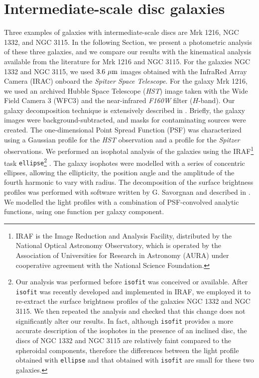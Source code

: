 \documentclass[useAMS,usenatbib,article]{mnras}
\begin{document}
\section{Intermediate-scale disc galaxies}
\label{sec:gal}
Three examples of galaxies with intermediate-scale discs are Mrk 1216, NGC 1332, and NGC 3115. 
In the following Section, we present a photometric analysis of these three galaxies, 
and we compare our results with the kinematical analysis available from the literature for Mrk 1216 and NGC 3115. 
For the galaxies NGC 1332 and NGC 3115, we used $3.6~\rm \mu m$ images obtained with the InfraRed Array Camera (IRAC) 
onboard the \emph{Spitzer Space Telescope}. 
For the galaxy Mrk 1216, we used an archived Hubble Space Telescope (\emph{HST}) image  
taken with the Wide Field Camera 3 (WFC3) and the near-infrared \emph{F160W} filter ($H$-band). 
Our galaxy decomposition technique is extensively described in \cite{paperI}.
Briefly, the galaxy images were background-subtracted, and masks for contaminating sources were created. 
The one-dimensional Point Spread Function (PSF) was characterized using a Gaussian profile for the \emph{HST} observation 
and a \cite{moffat1969} profile for the \emph{Spitzer} observations.
We performed an isophotal analysis of the galaxies using the IRAF\footnote{IRAF 
is the Image Reduction and Analysis Facility, distributed by the National Optical Astronomy Observatory, 
which is operated by the Association of Universities for Research in Astronomy (AURA) 
under cooperative agreement with the National Science Foundation.} task {\tt ellipse}\footnote{Our analysis 
was performed before {\tt isofit} \citep{ciambur2015} was conceived or available. 
After {\tt isofit} was recently developed and implemented in IRAF, 
we employed it to re-extract the surface brightness profiles of the galaxies NGC 1332 and NGC 3115. 
We then repeated the analysis and checked that this change does not significantly alter our results. 
In fact, although {\tt isofit} provides a more accurate description of the isophotes in the presence of an inclined disc, 
the discs of NGC 1332 and NGC 3115 are relatively faint compared to the spheroidal components, 
therefore the differences between the light profile obtained with {\tt ellipse} and that obtained with {\tt isofit} 
are small for these two galaxies. } 
\citep{taskellipse}. 
The galaxy isophotes were modelled with a series of concentric ellipses, 
allowing the ellipticity, the position angle and the amplitude of the fourth harmonic to vary with radius.  
The decomposition of the surface brightness profiles was performed with software written by G. Savorgnan 
and described in \cite{paperI}.
We modelled the light profiles with a combination of PSF-convolved analytic functions, 
using one function per galaxy component. 
\end{document}
